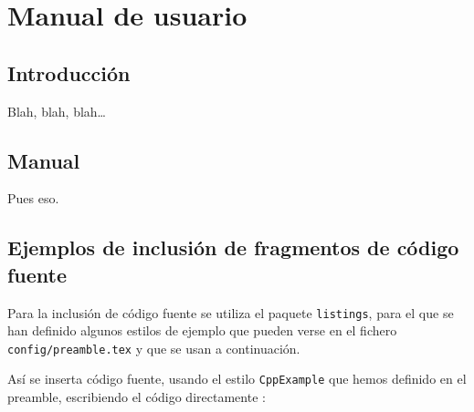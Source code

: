 %
%
%
% 
%
%
%
%

\chapter{Manual de usuario}
\label{cha:manual-de-usuario}

\section{Introducción}
\label{sec:intro-manual-de-usuario}

Blah, blah, blah\ldots


\section{Manual}
\label{sec:sec-manual-de-usuario}

Pues eso.


\section{Ejemplos de inclusión de fragmentos de código fuente}
\label{sec:codigo-fuente}

Para la inclusión de código fuente se utiliza el paquete
\texttt{listings}, para el que se han definido algunos estilos de
ejemplo que pueden verse en el fichero \texttt{config/preamble.tex} y
que se usan a continuación.

Así se inserta código fuente, usando el estilo \texttt{CppExample} que
hemos definido en el preamble, escribiendo el código directamente :

